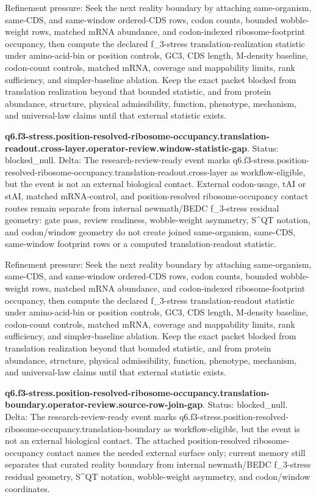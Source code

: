 Refinement pressure: Seek the next reality boundary by attaching same-organism, same-CDS, and same-window ordered-CDS rows, codon counts, bounded wobble-weight rows, matched mRNA abundance, and codon-indexed ribosome-footprint occupancy, then compute the declared f\_3-stress translation-realization statistic under amino-acid-bin or position controls, GC3, CDS length, M-density baseline, codon-count controls, matched mRNA, coverage and mappability limits, rank sufficiency, and simpler-baseline ablation. Keep the exact packet blocked from translation realization beyond that bounded statistic, and from protein abundance, structure, physical admissibility, function, phenotype, mechanism, and universal-law claims until that external statistic exists.

\textbf{q6.f3-stress.position-resolved-ribosome-occupancy.translation-readout.cross-layer.operator-review.window-statistic-gap}. Status: blocked\_null. Delta: The research-review-ready event marks q6.f3-stress.position-resolved-ribosome-occupancy.translation-readout.cross-layer as workflow-eligible, but the event is not an external biological contact. External codon-usage, tAI or stAI, matched mRNA-control, and position-resolved ribosome-occupancy contact routes remain separate from internal newmath/BEDC f\_3-stress residual geometry: gate pass, review readiness, wobble-weight asymmetry, S\textasciicircum{}QT notation, and codon/window geometry do not create joined same-organism, same-CDS, same-window footprint rows or a computed translation-readout statistic.

Refinement pressure: Seek the next reality boundary by attaching same-organism, same-CDS, and same-window ordered-CDS rows, codon counts, bounded wobble-weight rows, matched mRNA abundance, and codon-indexed ribosome-footprint occupancy, then compute the declared f\_3-stress translation-readout statistic under amino-acid-bin or position controls, GC3, CDS length, M-density baseline, codon-count controls, matched mRNA, coverage and mappability limits, rank sufficiency, and simpler-baseline ablation. Keep the exact packet blocked from translation realization beyond that bounded statistic, and from protein abundance, structure, physical admissibility, function, phenotype, mechanism, and universal-law claims until that external statistic exists.

\textbf{q6.f3-stress.position-resolved-ribosome-occupancy.translation-boundary.operator-review.source-row-join-gap}. Status: blocked\_null. Delta: The research-review-ready event marks q6.f3-stress.position-resolved-ribosome-occupancy.translation-boundary as workflow-eligible, but the event is not an external biological contact. The attached position-resolved ribosome-occupancy contact names the needed external surface only; current memory still separates that curated reality boundary from internal newmath/BEDC f\_3-stress residual geometry, S\textasciicircum{}QT notation, wobble-weight asymmetry, and codon/window coordinates.

